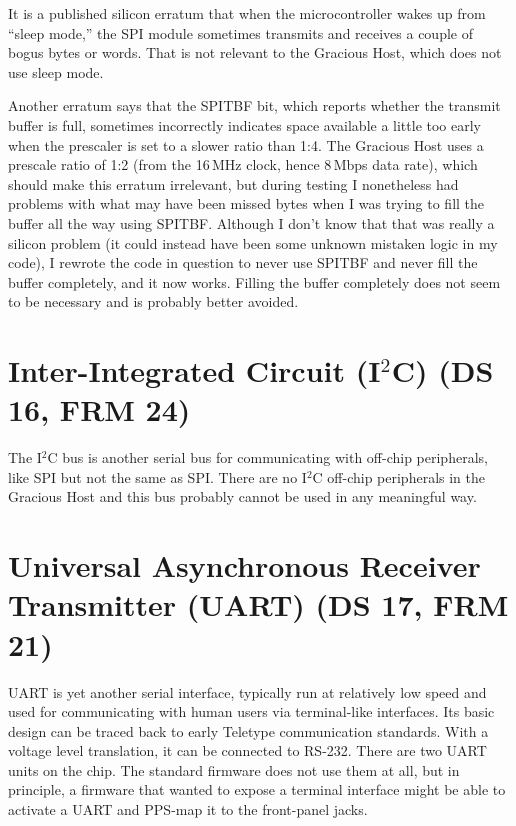 It is a published silicon erratum that when the microcontroller wakes up
from ``sleep mode,'' the SPI module sometimes transmits and receives a
couple of bogus bytes or words.  That is not relevant to the Gracious Host,
which does not use sleep mode.

Another erratum says that the SPITBF bit, which reports whether the transmit
buffer is full, sometimes incorrectly indicates space available a little too
early when the prescaler is set to a slower ratio than 1:4.  The Gracious
Host uses a prescale ratio of 1:2 (from the 16\,MHz clock, hence 8\,Mbps
data rate), which should make this erratum irrelevant, but during testing I
nonetheless had problems with what may have been missed bytes when I was
trying to fill the buffer all the way using SPITBF.  Although I don't know
that that was really a silicon problem (it could instead have been some
unknown mistaken logic in my code), I rewrote the code in question to never
use SPITBF and never fill the buffer completely, and it now works.  Filling
the buffer completely does not seem to be necessary and is probably better
avoided.


\section{Inter-Integrated Circuit (I$^2$C) (DS 16, FRM 24)}

The I$^2$C bus is another serial bus for communicating with off-chip
peripherals, like SPI but not the same as SPI.  There are no I$^2$C off-chip
peripherals in the Gracious Host and this bus probably cannot be used in any
meaningful way.


\section{Universal Asynchronous Receiver Transmitter (UART) (DS 17, FRM 21)}

UART is yet another serial interface, typically run at relatively low speed
and used for communicating with human users via terminal-like interfaces. 
Its basic design can be traced back to early Teletype communication
standards.  With a voltage level translation, it can be connected to RS-232. 
There are two UART units on the chip.  The standard firmware does not use
them at all, but in principle, a firmware that wanted to expose a terminal
interface might be able to activate a UART and PPS-map it to the front-panel
jacks.

